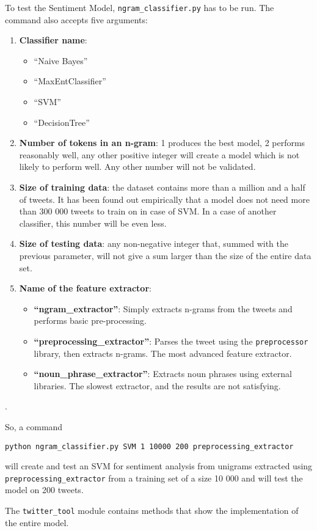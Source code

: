 \par To test the Sentiment Model, \texttt{ngram\_classifier.py} has to be run. The command also accepts five arguments: 
\begin{enumerate}
    \item \textbf{Classifier name}: 
    \begin{itemize}
    \item ``Naive Bayes''
    \item ``MaxEntClassifier''
    \item ``SVM''
    \item ``DecisionTree''
  \end{itemize}
    \item \textbf{Number of tokens in an n-gram}: 1 produces the best model, 2 performs reasonably well, any other positive integer will create a model which is not likely to perform well. Any other number will not be validated.
    \item \textbf{Size of training data}: the dataset contains more than a million and a half of tweets. It has been found out empirically that a model does not need more than 300 000 tweets to train on in case of SVM. In a case of another classifier, this number will be even less. 
    \item \textbf{Size of testing data}: any non-negative integer that, summed with the previous parameter, will not give a sum larger than the size of the entire data set.
    \item \textbf{Name of the feature extractor}:
    \begin{itemize}
    \item \textbf{``ngram\_extractor''}: Simply extracts n-grams from the tweets and performs basic pre-processing.
    \item \textbf{``preprocessing\_extractor''}: Parses the tweet using the \texttt{preprocessor} library, then extracts n-grams. The most advanced feature extractor. 
    \item \textbf{``noun\_phrase\_extractor''}: Extracts noun phrases using external libraries. The slowest extractor, and the results are not satisfying.
  \end{itemize}
\end{enumerate}.

So, a command
\begin{center}
\texttt{python ngram\_classifier.py SVM 1 10000 200 preprocessing\_extractor}
\end{center}

will create and test an SVM for sentiment analysis from unigrams extracted using\\ \texttt{preprocessing\_extractor} from a training set of a size 10 000 and will test the model on 200 tweets.

The \texttt{twitter\_tool} module contains methods that show the implementation of the entire model. 

